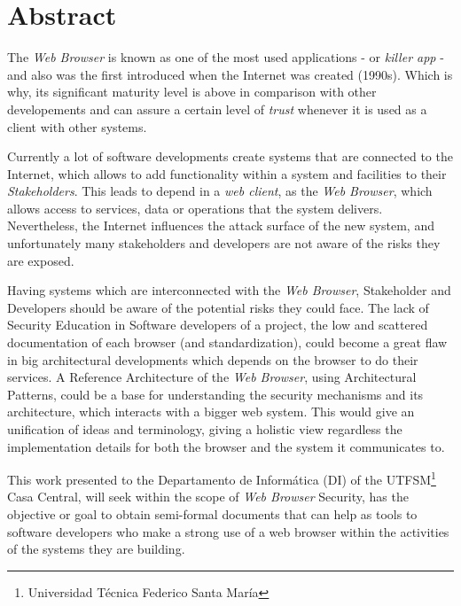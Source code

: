 \section*{Abstract}
\label{chap:abstract}

The \textit{Web Browser} is known as one of the most used applications - or \textit{killer app} - and also was the first introduced when the Internet was created (1990s). Which is why, its significant maturity level is above in comparison with other developements and can assure a certain level of \textit{trust} whenever it is used as a client with other systems.

Currently a lot of software developments create systems that are connected to the Internet, which allows to add functionality within a system and facilities to their \textit{Stakeholders}. This leads to depend in a \textit{web client}, as the \textit{Web Browser}, which allows access to services, data or operations that the system delivers. Nevertheless, the Internet influences the attack surface of the new system, and unfortunately many stakeholders and developers are not aware of the risks they are exposed.

Having systems which are interconnected with the \textit{Web Browser}, Stakeholder and Developers should be aware of the potential risks they could face. The lack of Security Education in Software developers of a project, the low and scattered documentation of each browser (and standardization), could become a great flaw in big architectural developments which depends on the browser to do their services. A Reference Architecture of the \textit{Web Browser}, using Architectural Patterns, could be a base for understanding the security mechanisms and its architecture, which interacts with a bigger web system. This would give an unification of ideas and terminology, giving a holistic view regardless the implementation details for both the browser and the system it communicates to.

This work presented to the Departamento de Informática (DI) of the UTFSM\footnote{Universidad Técnica Federico Santa María} Casa Central, will seek within the scope of \textit{Web Browser} Security, has the objective or goal to obtain semi-formal documents that can help as tools to software developers who make a strong use of a web browser within the activities of the systems they are building.





